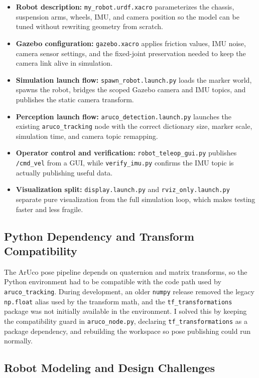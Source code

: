 \documentclass[12pt,a4paper]{article}
\begin{document}
\begin{itemize}[leftmargin=*]
    \item \textbf{Robot description:} \texttt{my\_robot.urdf.xacro} parameterizes the chassis, suspension arms, wheels, IMU, and camera position so the model can be tuned without rewriting geometry from scratch.
    \item \textbf{Gazebo configuration:} \texttt{gazebo.xacro} applies friction values, IMU noise, camera sensor settings, and the fixed-joint preservation needed to keep the camera link alive in simulation.
    \item \textbf{Simulation launch flow:} \texttt{spawn\_robot.launch.py} loads the marker world, spawns the robot, bridges the scoped Gazebo camera and IMU topics, and publishes the static camera transform.
    \item \textbf{Perception launch flow:} \texttt{aruco\_detection.launch.py} launches the existing \texttt{aruco\_tracking} node with the correct dictionary size, marker scale, simulation time, and camera topic remapping.
    \item \textbf{Operator control and verification:} \texttt{robot\_teleop\_gui.py} publishes \texttt{/cmd\_vel} from a GUI, while \texttt{verify\_imu.py} confirms the IMU topic is actually publishing useful data.
    \item \textbf{Visualization split:} \texttt{display.launch.py} and \texttt{rviz\_only.launch.py} separate pure visualization from the full simulation loop, which makes testing faster and less fragile.
\end{itemize}

\subsection{Python Dependency and Transform Compatibility}

The ArUco pose pipeline depends on quaternion and matrix transforms, so the Python environment had to be compatible with the code path used by \texttt{aruco\_tracking}. During development, an older \texttt{numpy} release removed the legacy \texttt{np.float} alias used by the transform math, and the \texttt{tf\_transformations} package was not initially available in the environment. I solved this by keeping the compatibility guard in \texttt{aruco\_node.py}, declaring \texttt{tf\_transformations} as a package dependency, and rebuilding the workspace so pose publishing could run normally.

\subsection{Robot Modeling and Design Challenges}
\end{document}
